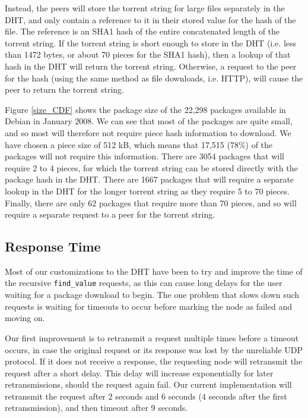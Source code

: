 \documentclass[conference]{IEEEtran}
\begin{document}
Instead, the peers will store the torrent string for large files
separately in the DHT, and only contain a reference to it in their
stored value for the hash of the file. The reference is an SHA1 hash
of the entire concatenated length of the torrent string. If the
torrent string is short enough to store in the DHT (i.e. less than
1472 bytes, or about 70 pieces for the SHA1 hash), then a lookup of
that hash in the DHT will return the torrent string. Otherwise, a
request to the peer for the hash (using the same method as file
downloads, i.e. HTTP), will cause the peer to return the torrent
string.

Figure \ref{size_CDF} shows the package size of the 22,298 packages
available in Debian in January 2008. We can see that most of the
packages are quite small, and so most will therefore not require
piece hash information to download. We have chosen a piece
size of 512 kB, which means that 17,515 (78\%) of the packages will
not require this information. There are 3054 packages that will
require 2 to 4 pieces, for which the torrent string can be stored
directly with the package hash in the DHT. There are 1667 packages
that will require a separate lookup in the DHT for the longer
torrent string as they require 5 to 70 pieces. Finally, there are
only 62 packages that require more than 70 pieces, and so will
require a separate request to a peer for the torrent string.

\subsection{Response Time}
\label{response_time}

Most of our customizations to the DHT have been to try and improve
the time of the recursive \texttt{find\_value} requests, as this can
cause long delays for the user waiting for a package download to
begin. The one problem that slows down such requests is waiting for
timeouts to occur before marking the node as failed and moving on.

Our first improvement is to retransmit a request multiple times
before a timeout occurs, in case the original request or its
response was lost by the unreliable UDP protocol. If it does not
receive a response, the requesting node will retransmit the request
after a short delay. This delay will increase exponentially for
later retransmissions, should the request again fail. Our current
implementation will retransmit the request after 2 seconds and 6
seconds (4 seconds after the first retransmission), and then timeout
after 9 seconds.
\end{document}

